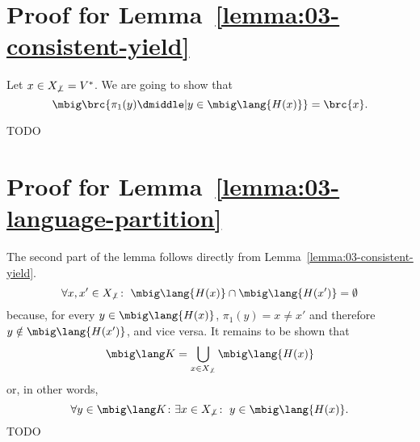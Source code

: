 \section{Proof for Lemma~\ref{lemma:03-consistent-yield}}\label{appendix:03-consistent-yield}

Let $x\in X_{\not\bot} = V^*$. We are going to show that
\[
 \mbig\brc{\pi_1(y) \dmiddle| y\in\mbig\lang{H(x)}} = \brc{x}.
\]

{\color{red}TODO}

\section{Proof for Lemma~\ref{lemma:03-language-partition}}\label{appendix:03-language-partition}

The second part of the lemma follows directly from Lemma~\ref{lemma:03-consistent-yield}.
\[
 \forall x,x'\in X_{\not\bot}\colon\; \mbig\lang{H(x)} \cap \mbig\lang{H(x')} = \emptyset
\]
because, for every $y\in\mbig\lang{H(x)}$, $\pi_1(y) = x\neq x'$ and therefore
$y\notin\mbig\lang{H(x')}$, and vice versa. It remains to be shown that
\[
 \mbig\lang K = \bigcup_{x\in X_{\not\bot}} \mbig\lang{H(x)}
\]
or, in other words,
\[
 \forall y\in \mbig\lang K\colon \exists x\in X_{\not\bot}\colon\; y\in\mbig\lang{H(x)}.
\]
{\color{red}TODO}
